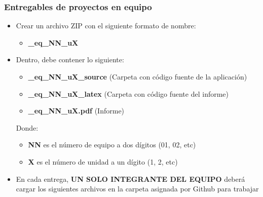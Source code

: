 \begin{frame}
\frametitle{Entregables de proyectos en equipo}
    \begin{itemize}
    \item Crear un archivo ZIP con el siguiente formato de nombre:
    \begin{itemize}
        \item \textbf{\clavegrupo\_eq\_NN\_uX}
    \end{itemize}
    \item Dentro, debe contener lo siguiente:
\begin{itemize}
\item \textbf{\clavegrupo\_eq\_NN\_uX\_source} (Carpeta con c\'odigo fuente de la aplicaci\'on)
\item \textbf{\clavegrupo\_eq\_NN\_uX\_latex} (Carpeta con c\'odigo fuente del informe)
\item \textbf{\clavegrupo\_eq\_NN\_uX.pdf} (Informe)
\end{itemize}
Donde:
\begin{itemize}
\item \textbf{NN} es el n\'umero de equipo a dos d\'igitos (01, 02, etc)
\item \textbf{X} es el n\'umero de unidad a un d\'igito (1, 2, etc)
\end{itemize}
\item En cada entrega, \textbf{UN SOLO INTEGRANTE DEL EQUIPO} deberá cargar los siguientes archivos en la carpeta asignada por Github para trabajar
\end{itemize}


\end{frame}




